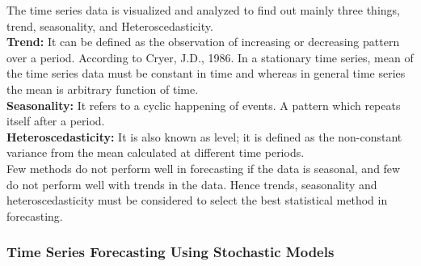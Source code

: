 \documentclass[10pt]{report}
\begin{document}
\begin{flushleft}
		The time series data is visualized and analyzed to find out mainly three things, trend, seasonality, and Heteroscedasticity. \\
		
		\textbf{Trend:} It can be defined as the observation of increasing or decreasing pattern over a period. According to Cryer, J.D., 1986. In a stationary time series, mean of the time series data must be constant in time and whereas in general time series the mean is arbitrary function of time.\\
		
		\textbf{Seasonality:} It refers to a cyclic happening of events. A pattern which repeats itself after a period.\\
		
		\textbf{Heteroscedasticity:} It is also known as level; it is defined as the non-constant variance from the mean calculated at different time periods.\\
		
		Few methods do not perform well in forecasting if the data is seasonal, and few do not perform well with trends in the data. Hence trends, seasonality and heteroscedasticity must be considered to select the best statistical method in forecasting. 
		
		\subsubsection{Time Series Forecasting Using Stochastic Models}
		

\end{flushleft}
\end{document}
